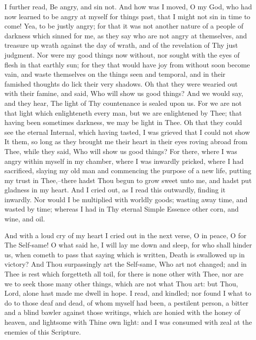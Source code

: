 \documentclass[b5paper,openright,12pt,twoside]{book}
\begin{document}
I further read, Be angry, and sin not. And how was I moved, O my God,
who had now learned to be angry at myself for things past, that I might
not sin in time to come! Yea, to be justly angry; for that it was not
another nature of a people of darkness which sinned for me, as they say
who are not angry at themselves, and treasure up wrath against the day
of wrath, and of the revelation of Thy just judgment. Nor were my good
things now without, nor sought with the eyes of flesh in that earthly
sun; for they that would have joy from without soon become vain, and
waste themselves on the things seen and temporal, and in their famished
thoughts do lick their very shadows. Oh that they were wearied out with
their famine, and said, Who will show us good things? And we would say,
and they hear, The light of Thy countenance is sealed upon us. For we
are not that light which enlighteneth every man, but we are enlightened
by Thee; that having been sometimes darkness, we may be light in Thee.
Oh that they could see the eternal Internal, which having tasted, I was
grieved that I could not show It them, so long as they brought me their
heart in their eyes roving abroad from Thee, while they said, Who will
show us good things? For there, where I was angry within myself in my
chamber, where I was inwardly pricked, where I had sacrificed, slaying
my old man and commencing the purpose of a new life, putting my trust
in Thee,--there hadst Thou begun to grow sweet unto me, and hadst put
gladness in my heart. And I cried out, as I read this outwardly, finding
it inwardly. Nor would I be multiplied with worldly goods; wasting away
time, and wasted by time; whereas I had in Thy eternal Simple Essence
other corn, and wine, and oil.

And with a loud cry of my heart I cried out in the next verse, O in
peace, O for The Self-same! O what said he, I will lay me down and
sleep, for who shall hinder us, when cometh to pass that saying which is
written, Death is swallowed up in victory? And Thou surpassingly art the
Self-same, Who art not changed; and in Thee is rest which forgetteth all
toil, for there is none other with Thee, nor are we to seek those many
other things, which are not what Thou art: but Thou, Lord, alone hast
made me dwell in hope. I read, and kindled; nor found I what to do to
those deaf and dead, of whom myself had been, a pestilent person, a
bitter and a blind bawler against those writings, which are honied
with the honey of heaven, and lightsome with Thine own light: and I was
consumed with zeal at the enemies of this Scripture.
\end{document}
